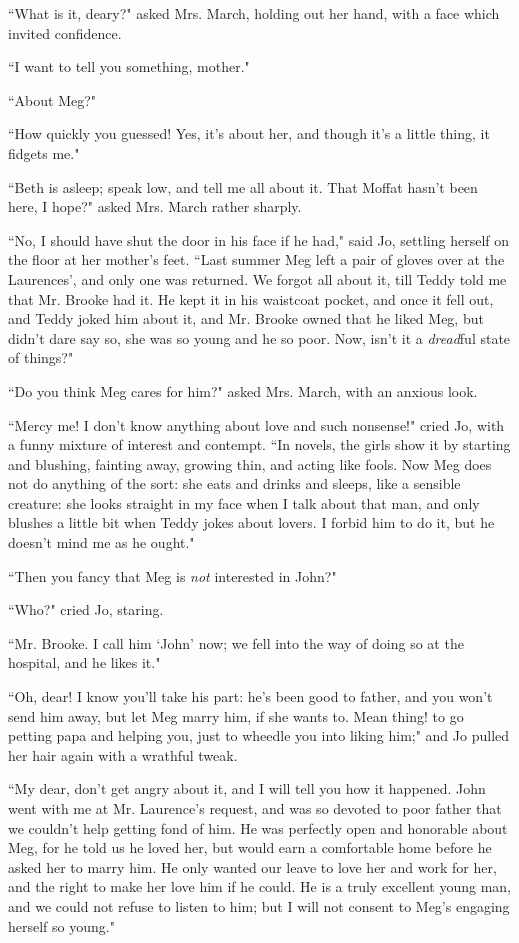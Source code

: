 ``What is it, deary?" asked Mrs. March, holding out her hand, with a face
which invited confidence.

``I want to tell you something, mother."

``About Meg?"

``How quickly you guessed! Yes, it's about her, and
though it's a little thing, it fidgets me."

``Beth is asleep; speak low, and tell me all about it. That Moffat
hasn't been here, I hope?" asked Mrs. March rather
sharply.

``No, I should have shut the door in his face if he had," said Jo,
settling herself on the floor at her mother's feet.
``Last summer Meg left a pair of gloves over at the
Laurences', and only one was returned. We forgot all
about it, till Teddy told me that Mr. Brooke had it. He kept it in his
waistcoat pocket, and once it fell out, and Teddy joked him about it,
and Mr. Brooke owned that he liked Meg, but didn't dare
say so, she was so young and he so poor. Now, isn't it a
\emph{dread}ful state of things?"

``Do you think Meg cares for him?" asked Mrs. March, with an anxious
look.

``Mercy me! I don't know anything about love and such
nonsense!" cried Jo, with a funny mixture of interest and contempt. ``In
novels, the girls show it by starting and blushing, fainting away,
growing thin, and acting like fools. Now Meg does not do anything of the
sort: she eats and drinks and sleeps, like a sensible creature: she
looks straight in my face when I talk about that man, and only blushes a
little bit when Teddy jokes about lovers. I forbid him to do it, but he
doesn't mind me as he ought."

``Then you fancy that Meg is \emph{not} interested in John?"

``Who?" cried Jo, staring.

``Mr. Brooke. I call him `John' now; we
fell into the way of doing so at the hospital, and he likes it."

``Oh, dear! I know you'll take his part:
he's been good to father, and you won't
send him away, but let Meg marry him, if she wants to. Mean thing! to go
petting papa and helping you, just to wheedle you into liking him;" and
Jo pulled her hair again with a wrathful tweak.

``My dear, don't get angry about it, and I will tell you
how it happened. John went with me at Mr. Laurence's
request, and was so devoted to poor father that we
couldn't help getting fond of him. He was perfectly open
and honorable about Meg, for he told us he loved her, but would earn a
comfortable home before he asked her to marry him. He only wanted our
leave to love her and work for her, and the right to make her love him
if he could. He is a truly excellent young man, and we could not refuse
to listen to him; but I will not consent to Meg's
engaging herself so young."


